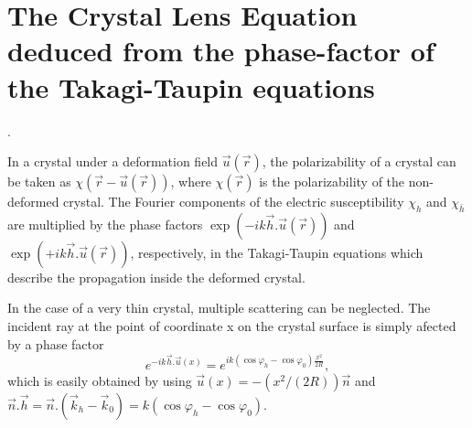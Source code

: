 \documentclass[preprint]{iucr}              %
\begin{document}




\appendix
\section{The Crystal Lens Equation deduced from the phase-factor of the Takagi-Taupin equations}
\label{sec:appendixCLE}.

In a crystal under a deformation field $\vec u(\vec r)$, the polarizability of a crystal can be taken as $\chi(\vec r-\vec u(\vec r))$, where $\chi(\vec r)$ is the polarizability of the non-deformed crystal. The Fourier components of the electric susceptibility $\chi_h$ and $\chi_{\bar h}$ are multiplied by the phase factors $\exp(-i k \vec h . \vec u (\vec r))$ and $\exp(+i k \vec h . \vec u (\vec r))$, respectively, in the Takagi-Taupin equations which describe  the propagation inside the deformed crystal.

In the case of a very thin crystal, multiple scattering can be neglected. The incident ray at the point of coordinate x on the crystal surface is simply afected by a phase factor 
\begin{equation}
    e^{-i k \vec h . \vec u(x)} = e^{i k (\cos\varphi_h-\cos\varphi_0) \frac{x^2}{2 R} },
\end{equation}
which is easily obtained by using $\vec u(x) = -(x^2/(2R))\vec n$ and $\vec n . \vec h = \vec n.(\vec k_h - \vec k_0) = k(\cos\varphi_h-\cos\varphi_0)$. 
\end{document}

